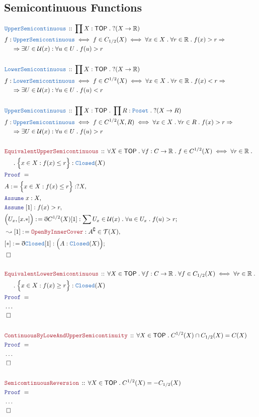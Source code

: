 \documentclass[12pt]{scrartcl}
\newcommand{\TYPE}[1]{\textcolor{NavyBlue}{\mathtt{#1}}}
\newcommand{\LOGIC}[1]{\textcolor{Blue}{\mathtt{#1}}}
\newcommand{\THM}[1]{\textcolor{Maroon}{\mathtt{#1}}}
\renewcommand{\.}{\; . \;}
\newcommand{\de}{: \kern 0.1pc =}
\newcommand{\Theorem}[2]{& \THM{#1} \, :: \, #2 \\ & \Proof = \\ }
\newcommand{\DeclareType}[2]{& \TYPE{#1} \, :: \, #2 \\}
\newcommand{\DefineNamedType}[4]{& #1 : \TYPE{#2} \iff #3 \iff #4 \\}
\newcommand{\NewLine}{\\ & \kern 1pc}
\newcommand{\Page}[1]{ \begin{align*} #1 \end{align*}   }
\newcommand{ \bd }{ \ByDef }
\newcommand{\NoProof}{ & \ldots \\ \EndProof}
\newcommand{\Imply}{\Rightarrow}
\newcommand{\Reals}{\mathbb{R} }
\renewcommand{\c}{\complement}
\newcommand{\Say}[3]{& #1 \de #2 : #3, \\}
\newcommand{\Conclude}[3]{& #1 \de #2 : #3; \\}
\newcommand{\Derive}[3]{& \leadsto #1 \de #2 : #3, \\}
\newcommand{\Assume}[2]{& \LOGIC{Assume} \; #1 : #2, \\}
\newcommand{\QED}{\; \square}
\newcommand{\EndProof}{& \QED \\}
\newcommand{\ByDef}{\eth}
\newcommand{\Proof}{\LOGIC{Proof} \; }
\newcommand{\TOP}{\mathsf{TOP}}
\newcommand{\T}{\mathcal{T}}
\newcommand{\U}{\mathcal{U}}
\begin{document}
\subsection{Semicontinuous Functions}
\Page{
	\DeclareType{UpperSemicontinuous}
	{
		\prod X : \TOP \. ?(X \to \Reals)
	}
	\DefineNamedType{f}{UpperSemicontinuous}{f \in C_{1/2}(X) }
	{
		\forall x \in X \. \forall r \in \Reals \. 
		f(x) > r  \Imply \NewLine \Imply \exists U \in \U(x) : \forall u \in U \. f(u) > r
	}
	\\
	\DeclareType{LowerSemicontinuous}
	{
		\prod X : \TOP \. ?(X \to \Reals)
	}
	\DefineNamedType{f}{LowerSemicontinuous}{f \in C^{1/2}(X) }
	{
		\forall x \in X \. \forall r \in \Reals \. 
		f(x) < r  \Imply \NewLine \Imply \exists U \in \U(x) : \forall u \in U \. f(u) < r
	}
	\\
	\DeclareType{UpperSemicontinuous}
	{
		\prod X : \TOP \. \prod R : \TYPE{Poset} \.  ?(X \to R)
	}
	\DefineNamedType{f}{UpperSemicontinuous}{f \in C^{1/2}(X,R) }
	{
		\forall x \in X \. \forall r \in R \. 
		f(x) > r  \Imply \NewLine \Imply \exists U \in \U(x) : \forall u \in U \. f(u) > r
	}
	\\
	\Theorem{EquivalentUpperSemicontinuous}
	{
		\forall X \in \TOP \. \forall f : C \to \Reals \.
		 f \in C^{1/2}(X) \iff
		\forall r \in \Reals  \. \NewLine \. 
		\Big\{ x \in X :  f(x) \le r \Big\} : \TYPE{Closed}(X)
	}
	\Say{A}{\Big\{ x \in X : f(x) \le r \Big\}}{?X}
	\Assume{x}{ X  }
	\Assume{[1]}{f(x) > r}
	\Conclude{\Big( U_x,[x.*]\Big)}{\bd C^{1/2}(X)[1]}{\sum U_x \in \U(x) \. \forall u \in U_x \. f(u) > r}
	\Derive{[1]}{\THM{OpenByInnerCover}}{A^\c \in \T(X)}
	\Conclude{[*]}{\bd \TYPE{Closed}[1]}{\Big( A : \TYPE{Closed}(X) \Big)}
	\EndProof
	\\
	\Theorem{EquivalentLowerSemicontinuous}
	{
		\forall X \in \TOP \. \forall f : C \to \Reals \.
		\forall f \in C_{1/2}(X) \iff
		\forall r \in \Reals  \. \NewLine \. 
		\Big\{ x \in X :  f(x) \ge r \Big\} : \TYPE{Closed}(X)
	}
	\NoProof
	\\
	\Theorem{ContinuousByLoweAndUpperSemicontinuity}
	{
		\forall X \in \TOP \.
		 C^{1/2}(X) \cap  C_{1/2}(X) = C(X)
	}
	\NoProof
	\\
	\Theorem{SemicomtinuousReversion}
	{
		\forall X \in \TOP \.
		C^{1/2}(X) = - C_{1/2}(X)
	}
	\NoProof
}
\end{document}
